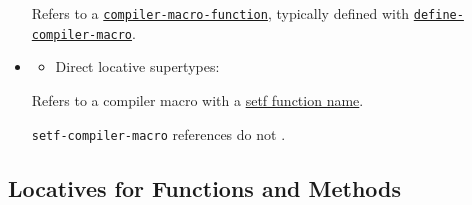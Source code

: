 \begin{itemize}
  Refers to a
  \href{http://www.lispworks.com/documentation/HyperSpec/Body/f_cmp_ma.htm}{\texttt{compiler-macro-function}},
  typically defined with
  \href{http://www.lispworks.com/documentation/HyperSpec/Body/m_define.htm}{\texttt{define-compiler-macro}}.
\item
  \label{x-28DREF-3ASETF-COMPILER-MACRO-20MGL-PAX-3ALOCATIVE-29}

  \begin{itemize}
  \tightlist
  \item
    Direct locative supertypes:
  \end{itemize}

  Refers to a compiler macro with a
  \href{http://www.lispworks.com/documentation/HyperSpec/Body/26_glo_s.htm\#setf_function_name}{setf
  function name}.

  \texttt{setf-compiler-macro} references do not
  .
\end{itemize}

\subsection{Locatives for Functions and
Methods}\label{locatives-for-functions-and-methods}

\label{x-28DREF-3A-40FUNCTIONLIKE-LOCATIVES-20MGL-PAX-3ASECTION-29}

